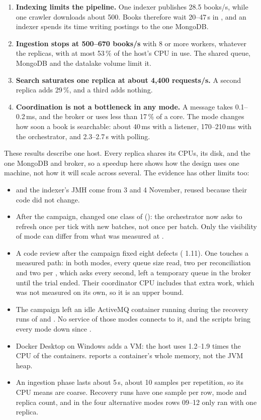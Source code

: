 \begin{enumerate}
\item \textbf{Indexing limits the pipeline.} One indexer publishes 28.5 books/s, while one crawler downloads about 500.
  Books therefore wait 20--47\,s in , and an indexer spends its time writing postings to the one
  MongoDB.
\item \textbf{Ingestion stops at 500--670 books/s} with 8 or more workers, whatever the replicas, with at most 53\,\% of
  the host's CPU in use. The shared queue, MongoDB and the datalake volume limit it.
\item \textbf{Search saturates one  replica at about 4{,}400 requests/s.} A second replica adds 29\,\%,
  and a third adds nothing.
\item \textbf{Coordination is not a bottleneck in any mode.} A message takes 0.1--0.2\,ms, and the broker or
   uses less than 17\,\% of a core. The mode changes how soon a book is searchable: about 40\,ms with a
  listener, 170--210\,ms with the orchestrator, and 2.3--2.7\,s with polling.
\end{enumerate}

These results describe one host. Every replica shares its CPUs, its disk, and the one MongoDB and broker, so a speedup
here shows how the design uses one machine, not how it will scale across several. The evidence has other limits too:
\begin{itemize}
\item {} and the indexer's JMH come from 3 and 4 November, reused because their code did not change.
\item After the campaign,  changed one class of  (): the orchestrator now asks
   to refresh once per tick with new batches, not once per batch. Only the visibility of mode
   can differ from what was measured at .
\item A code review after the campaign fixed eight defects ( 1.11). One touches a measured path: in both
   modes, every queue size  read, two per reconciliation and two per
  , which  asks every second, left a temporary queue in the broker until the
  trial ended. Their coordinator CPU includes that extra work, which was not measured on its own, so it is an upper
  bound.
\item The campaign left an idle ActiveMQ container running during the recovery runs of  and
  . No service of those modes connects to it, and the scripts bring every mode down since
  .
\item Docker Desktop on Windows adds a VM: the host uses 1.2--1.9 times the CPU of the containers. 
  reports a container's whole memory, not the JVM heap.
\item An ingestion phase lasts about 5\,s, about 10  samples per repetition, so its CPU means are
  coarse. Recovery runs have one sample per row, mode and replica count, and in the four alternative modes rows 09--12
  only ran with one replica.
\end{itemize}
